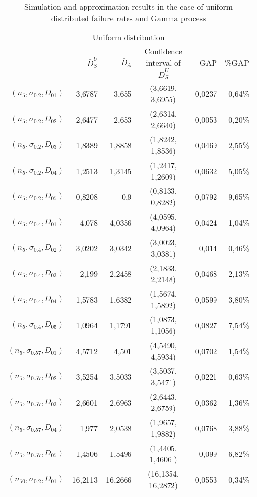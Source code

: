 \documentclass[preprint,12pt]{elsarticle}
\begin{document}
\begin{table}[htbp]
  \centering
  \caption{Simulation and approximation results in the case of uniform distributed failure rates and Gamma process}
    \begin{tabular}{rrrcrr}
    \toprule
      \multicolumn{6}{c}{Uniform distribution}\\
          & $\bar{D}_{S}^{U}$ & $\bar{D}_{A}$ & Confidence interval of $\bar{D}_{S}^{U}$ & GAP & \%GAP \\
    \midrule
$(n_{5},\sigma_{0.2},D_{01})$ & 3,6787 & 3,655 & (3,6619, 3,6955) & 0,0237 & 0,64\% \\
$(n_{5},\sigma_{0.2},D_{02})$ & 2,6477 & 2,653 & (2,6314, 2,6640) & 0,0053 & 0,20\% \\
$(n_{5},\sigma_{0.2},D_{03})$ & 1,8389 & 1,8858 & (1,8242, 1,8536) & 0,0469 & 2,55\% \\
$(n_{5},\sigma_{0.2},D_{04})$& 1,2513 & 1,3145 & (1,2417, 1,2609) & 0,0632 & 5,05\% \\
$(n_{5},\sigma_{0.2},D_{05})$ & 0,8208 & 0,9   & (0,8133, 0,8282) & 0,0792 & 9,65\% \\
$(n_{5},\sigma_{0.4},D_{01})$ & 4,078 & 4,0356 & (4,0595, 4,0964) & 0,0424 & 1,04\% \\
$(n_{5},\sigma_{0.4},D_{02})$ & 3,0202 & 3,0342 & (3,0023, 3,0381) & 0,014 & 0,46\% \\
$(n_{5},\sigma_{0.4},D_{03})$ & 2,199 & 2,2458 & (2,1833, 2,2148) & 0,0468 & 2,13\% \\
$(n_{5},\sigma_{0.4},D_{04})$ & 1,5783 & 1,6382 & (1,5674, 1,5892) & 0,0599 & 3,80\% \\
$(n_{5},\sigma_{0.4},D_{05})$ & 1,0964 & 1,1791 & (1,0873, 1,1056) & 0,0827 & 7,54\% \\
$(n_{5},\sigma_{0.57},D_{01})$ & 4,5712 & 4,501 & (4,5490, 4,5934) & 0,0702 & 1,54\% \\
$(n_{5},\sigma_{0.57},D_{02})$   & 3,5254 & 3,5033 & (3,5037, 3,5471) & 0,0221 & 0,63\% \\
$(n_{5},\sigma_{0.57},D_{03})$  & 2,6601 & 2,6963 & (2,6443, 2,6759) & 0,0362 & 1,36\% \\
$(n_{5},\sigma_{0.57},D_{04})$  & 1,977 & 2,0538 & (1,9657, 1,9882) & 0,0768 & 3,88\% \\
$(n_{5},\sigma_{0.57},D_{05})$ & 1,4506 & 1,5496 & (1,4405, 1,4606 ) & 0,099 & 6,82\% \\
$(n_{50},\sigma_{0.2},D_{01})$ & 16,2113 & 16,2666 & (16,1354, 16,2872) & 0,0553 & 0,34\% \\

\end{tabular}
\end{table}
\end{document}
